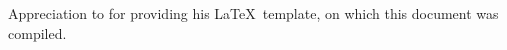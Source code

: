 %
%











%
%
%

%

Appreciation to  for providing his \LaTeX\ template, on which this document was compiled.

